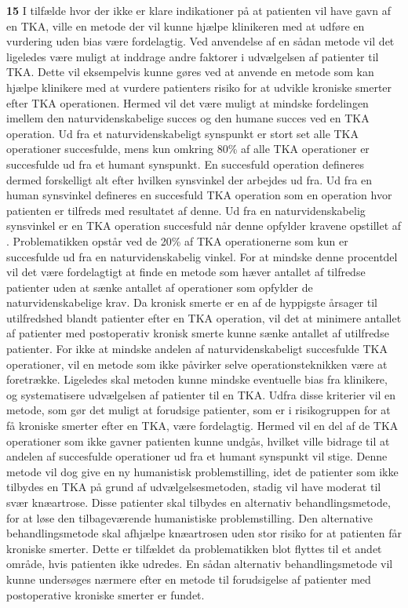 \textbf{15}
I tilfælde hvor der ikke er klare indikationer på at patienten vil have gavn af en TKA, ville en metode der vil kunne hjælpe klinikeren med at udføre en vurdering uden bias være fordelagtig. Ved anvendelse af en sådan metode vil det ligeledes være muligt at inddrage andre faktorer i udvælgelsen af patienter til TKA. Dette vil eksempelvis kunne gøres ved at anvende en metode som kan hjælpe klinikere med at vurdere patienters risiko for at udvikle kroniske smerter efter TKA operationen. Hermed vil det være muligt at mindske fordelingen imellem den naturvidenskabelige succes og den humane succes ved en TKA operation. Ud fra et naturvidenskabeligt synspunkt er stort set alle TKA operationer succesfulde, mens kun omkring 80\% af alle TKA operationer er succesfulde ud fra et humant synspunkt. \citep{aarsrapport2016} \citep{Bourne2010} En succesfuld operation defineres dermed forskelligt alt efter hvilken synsvinkel der arbejdes ud fra. Ud fra en human synsvinkel defineres en succesfuld TKA operation som en operation hvor patienten er tilfreds med resultatet af denne. Ud fra en naturvidenskabelig synsvinkel er en TKA operation succesfuld når denne opfylder kravene opstillet af \cite{aarsrapport2016}. Problematikken opstår ved de 20\% af TKA operationerne som kun er succesfulde ud fra en naturvidenskabelig vinkel. For at mindske denne procentdel vil det være fordelagtigt at finde en metode som hæver antallet af tilfredse patienter uden at sænke antallet af operationer som opfylder de naturvidenskabelige krav. Da kronisk smerte er en af de hyppigste årsager til utilfredshed blandt patienter efter en TKA operation, vil det at minimere antallet af patienter med postoperativ kronisk smerte kunne sænke antallet af utilfredse patienter. \citep{Bourne2010} For ikke at mindske andelen af naturvidenskabeligt succesfulde TKA operationer, vil en metode som ikke påvirker selve operationsteknikken være at foretrække. Ligeledes skal metoden kunne mindske eventuelle bias fra klinikere, og systematisere udvælgelsen af patienter til en TKA. Udfra disse kriterier vil en metode, som gør det muligt at forudsige patienter, som er i risikogruppen for at få kroniske smerter efter en TKA, være fordelagtig. Hermed vil en del af de TKA operationer som ikke gavner patienten kunne undgås, hvilket ville bidrage til at andelen af succesfulde operationer ud fra et humant synspunkt vil stige. Denne metode vil dog give en ny humanistisk problemstilling, idet de patienter som ikke tilbydes en TKA på grund af udvælgelsesmetoden, stadig vil have moderat til svær knæartrose. Disse patienter skal tilbydes en alternativ behandlingsmetode, for at løse den tilbageværende humanistiske problemstilling. Den alternative behandlingsmetode skal afhjælpe knæartrosen uden stor risiko for at patienten får kroniske smerter. Dette er tilfældet da problematikken blot flyttes til et andet område, hvis patienten ikke udredes. En sådan alternativ behandlingsmetode vil kunne undersøges nærmere efter en metode til forudsigelse af patienter med postoperative kroniske smerter er fundet. \\  
